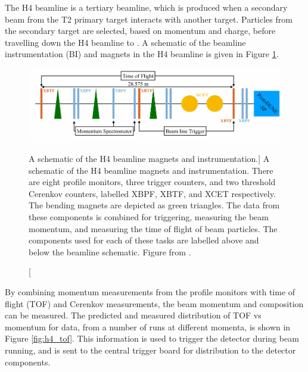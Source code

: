 The H4 beamline is a tertiary beamline, which is produced when a secondary beam
from the T2 primary target interacts with another target. Particles from the 
secondary target are selected, based on momentum and charge, before travelling 
down the H4 beamline to \protodune{}. A schematic of the beamline 
instrumentation (BI) and magnets in the H4 beamline is given in Figure 
\ref{fig:h4_schem}. 

\begin{figure}

	\centering

	\includegraphics[width=\textwidth]{figures/h4_schem.pdf}

	\caption
	[A schematic of the H4 beamline magnets and instrumentation.]
	{A schematic of the H4 beamline magnets and instrumentation. There are eight
	profile monitors, three trigger counters, and two threshold Cerenkov counters,
	labelled XBPF, XBTF, and XCET respectively. The bending magnets are depicted
	as green triangles. The data from these components is combined for triggering,
	measuring the beam momentum, and measuring the time of flight of beam
	particles. The components used for each of these tasks are labelled above and
	below the beamline schematic. Figure from \cite{protoduneperf}.}

	\label{fig:h4_schem}

\end{figure}

By combining momentum measurements from the profile monitors with time of flight
(TOF) and Cerenkov measurements, the beam momentum and composition can be 
measured. The predicted and measured distribution of TOF vs momentum for data,
from a number of runs at different momenta, is shown in Figure \ref{fig:h4_tof}.
This information is used to trigger the detector during beam running, and is
sent to the central trigger board for distribution to the detector components.

